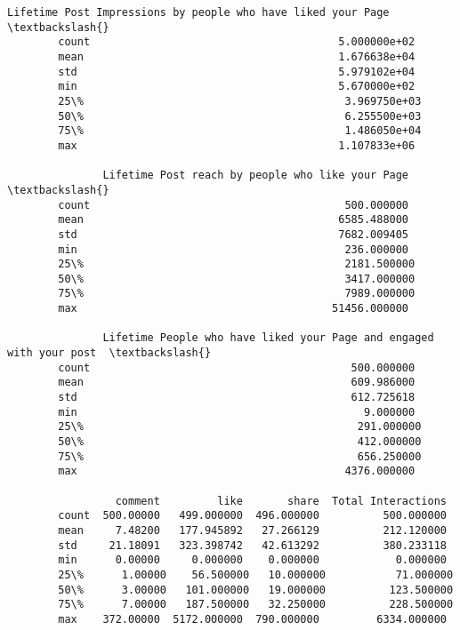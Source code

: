 \documentclass[11pt]{article}
\begin{document}
\begin{Verbatim}[commandchars=\\\{\}]
               Lifetime Post Impressions by people who have liked your Page  \textbackslash{}
        count                                       5.000000e+02              
        mean                                        1.676638e+04              
        std                                         5.979102e+04              
        min                                         5.670000e+02              
        25\%                                         3.969750e+03              
        50\%                                         6.255500e+03              
        75\%                                         1.486050e+04              
        max                                         1.107833e+06              
        
               Lifetime Post reach by people who like your Page  \textbackslash{}
        count                                        500.000000   
        mean                                        6585.488000   
        std                                         7682.009405   
        min                                          236.000000   
        25\%                                         2181.500000   
        50\%                                         3417.000000   
        75\%                                         7989.000000   
        max                                        51456.000000   
        
               Lifetime People who have liked your Page and engaged with your post  \textbackslash{}
        count                                         500.000000                     
        mean                                          609.986000                     
        std                                           612.725618                     
        min                                             9.000000                     
        25\%                                           291.000000                     
        50\%                                           412.000000                     
        75\%                                           656.250000                     
        max                                          4376.000000                     
        
                 comment         like       share  Total Interactions  
        count  500.00000   499.000000  496.000000          500.000000  
        mean     7.48200   177.945892   27.266129          212.120000  
        std     21.18091   323.398742   42.613292          380.233118  
        min      0.00000     0.000000    0.000000            0.000000  
        25\%      1.00000    56.500000   10.000000           71.000000  
        50\%      3.00000   101.000000   19.000000          123.500000  
        75\%      7.00000   187.500000   32.250000          228.500000  
        max    372.00000  5172.000000  790.000000         6334.000000  
\end{Verbatim}
            
\end{document}
